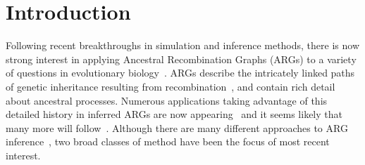 \documentclass{article}
\begin{document}
\section*{Introduction}
Following recent breakthroughs in simulation and inference methods,
there is now strong interest in applying Ancestral Recombination Graphs (ARGs)
to a variety of questions in evolutionary
biology~\citep{lewanski_era_2024,brandt_promise_2024,nielsen_inference_2025}.
ARGs describe the intricately linked paths
of genetic inheritance resulting from
recombination~\citep{hudson_properties_1983,griffiths_ancestral_1996,wong_general_2023},
and contain rich detail about ancestral processes.
Numerous applications taking advantage of this detailed history
in inferred ARGs are now appearing~\citep{
stern_approximate_2019,
fan_genealogical_2022,
hejase_deep_2022,
guo_recombination-aware_2022,
ignatieva_ongoing_2022,
wang_complex_2022,
zhang_biobank-scale_2023,
nowbandegani_extremely_2023,
ignatieva_distribution_2023,
fan_likelihood_2023,
osmond_estimating_2021,
huang_estimating_2024,
grundler_geographic_2024,
korfmann_simultaneous_2024,
deraje_inferring_2024,
speidel2025high}
and it seems likely that many more will
follow~\citep{harris_database_2019,harris_using_2023}.
Although there are many different approaches to ARG
inference~\citep{wong_general_2023}, two broad classes of method
have been the focus of most recent interest.
\end{document}
